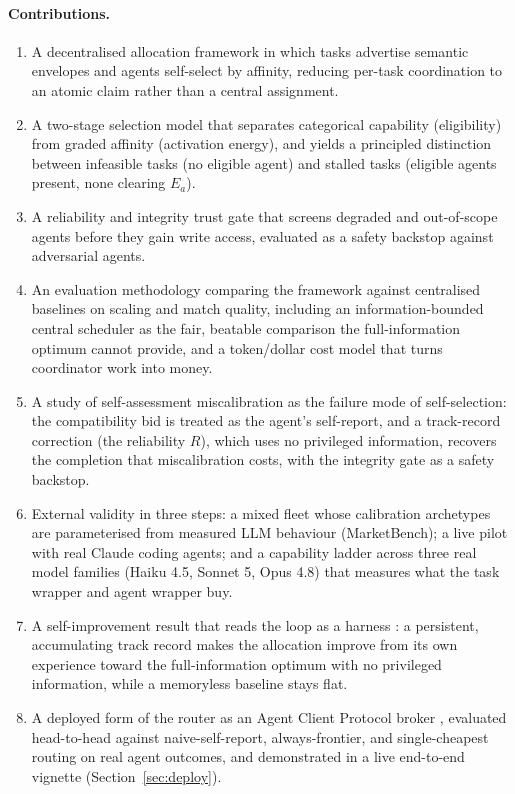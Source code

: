 \documentclass[11pt]{article}
\begin{document}
\paragraph{Contributions.}
\begin{enumerate}\itemsep2pt
\item A decentralised allocation framework in which tasks advertise semantic envelopes and agents self-select by affinity, reducing per-task coordination to an atomic claim rather than a central assignment.
\item A two-stage selection model that separates categorical capability (eligibility) from graded affinity (activation energy), and yields a principled distinction between infeasible tasks (no eligible agent) and stalled tasks (eligible agents present, none clearing $E_a$).
\item A reliability and integrity trust gate that screens degraded and out-of-scope agents before they gain write access, evaluated as a safety backstop against adversarial agents.
\item An evaluation methodology comparing the framework against centralised baselines on scaling and match quality, including an information-bounded central scheduler as the fair, beatable comparison the full-information optimum cannot provide, and a token/dollar cost model that turns coordinator work into money.
\item A study of self-assessment miscalibration as the failure mode of self-selection: the compatibility bid is treated as the agent's self-report, and a track-record correction (the reliability $R$), which uses no privileged information, recovers the completion that miscalibration costs, with the integrity gate as a safety backstop.
\item External validity in three steps: a mixed fleet whose calibration archetypes are parameterised from measured LLM behaviour (MarketBench); a live pilot with real Claude coding agents; and a capability ladder across three real model families (Haiku 4.5, Sonnet 5, Opus 4.8) that measures what the task wrapper and agent wrapper buy.
\item A self-improvement result that reads the loop as a harness \citep{weng2026harness}: a persistent, accumulating track record makes the allocation improve from its own experience toward the full-information optimum with no privileged information, while a memoryless baseline stays flat.
\item A deployed form of the router as an Agent Client Protocol broker \citep{acp2025}, evaluated head-to-head against naive-self-report, always-frontier, and single-cheapest routing on real agent outcomes, and demonstrated in a live end-to-end vignette (Section~\ref{sec:deploy}).
\end{enumerate}
\end{document}
